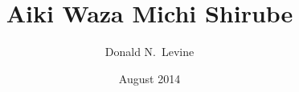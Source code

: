 \setlength{\belowcaptionskip}{1em}

\relax

\renewcommand{\ldots}{.~.~.}

\newcommand{\refstyle}{\leftmargin=1.1em \itemindent=-1em \setlength{\itemsep}{1pt} \setlength{\parskip}{0pt} \setlength{\parsep}{0pt}}


\title{Aiki Waza Michi Shirube}
\author{Donald N.~Levine}
\date{August 2014}



	\frontmatter
		
		\tableofcontents
		
	\mainmatter
		
		
		
		
		
		
		
		
		
		
		
		
	\appendix
		\setcounter{secnumdepth}{0}
		
		
